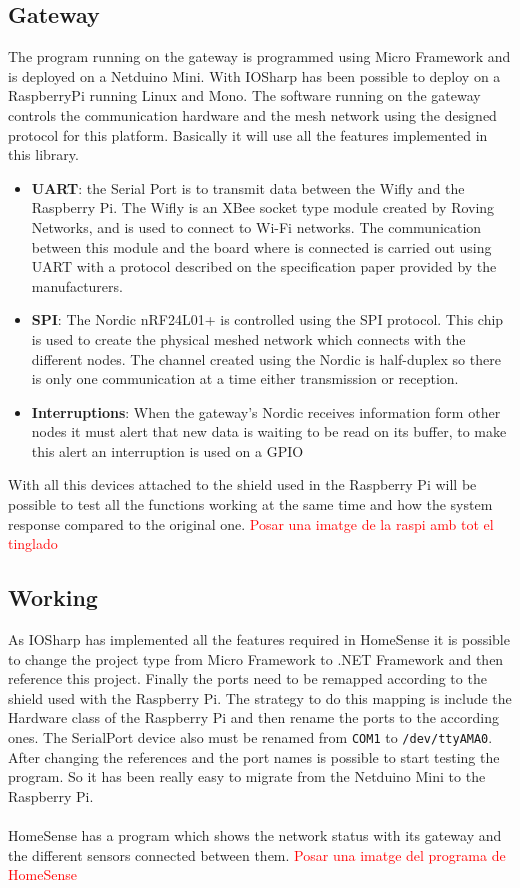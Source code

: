 \subsection{Gateway}\label{SS:IOEx-HomeSense-Gateway}
The program running on the gateway is programmed using Micro Framework and is deployed on a Netduino Mini. With IOSharp has been possible to deploy on a RaspberryPi running Linux and Mono. The software running on the gateway controls the communication hardware and the mesh network using the designed protocol for this platform.
Basically it will use all the features implemented in this library.

\begin{itemize}
\item \textbf{UART}: the Serial Port is to transmit data between the Wifly and the Raspberry Pi. The Wifly is an XBee socket type module created by Roving Networks, and is used to connect to Wi-Fi networks. The communication between this module and the board where is connected is carried out using UART with a protocol described on the specification paper provided by the manufacturers.

\item \textbf{SPI}: The Nordic nRF24L01+ is controlled using the SPI protocol. This chip is used to create the physical meshed network which connects with the different nodes. The channel created using the Nordic is half-duplex so there is only one communication at a time either transmission or reception.
\item \textbf{Interruptions}: When the gateway's Nordic receives information form other nodes it must alert that new data is waiting to be read on its buffer, to make this alert an interruption is used on a GPIO
\end{itemize}
With all this devices attached to the shield used in the Raspberry Pi will be possible to test all the functions working at the same time and how the system response compared to the original one.
\textcolor{red}{Posar una imatge de la raspi amb tot el tinglado}

\subsection{Working}\label{SS:IOEx-HomeSense-Working}
As IOSharp has implemented all the features required in HomeSense it is possible to change the project type from Micro Framework to .NET Framework and then reference this project. Finally the ports need to be remapped according to the shield used with the Raspberry Pi. The strategy to do this mapping is include the Hardware class of the Raspberry Pi and then rename the ports to the according ones. The SerialPort device also must be renamed from \verb!COM1! to \verb!/dev/ttyAMA0!. After changing the references and the port names is possible to start testing the program. So it has been really easy to migrate from the Netduino Mini to the Raspberry Pi.
\\
\\
HomeSense has a program which shows the network status with its gateway and the different sensors connected between them.
\textcolor{red}{Posar una imatge del programa de HomeSense}

